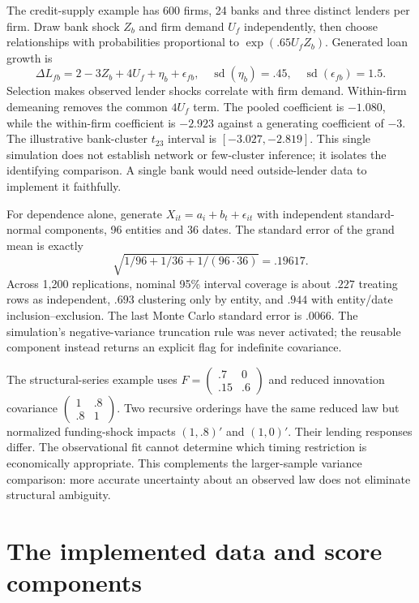 The credit-supply example has 600 firms, 24 banks and three distinct
lenders per firm. Draw bank shock $Z_b$ and firm demand $U_f$
independently, then choose relationships with probabilities proportional
to $\exp(.65U_fZ_b)$. Generated loan growth is
\[
 \Delta L_{fb}=2-3Z_b+4U_f+\eta_b+\epsilon_{fb},
 \quad \operatorname{sd}(\eta_b)=.45,\quad
 \operatorname{sd}(\epsilon_{fb})=1.5.
\]
Selection makes observed lender shocks correlate with firm demand.
Within-firm demeaning removes the common $4U_f$ term. The pooled
coefficient is $-1.080$, while the within-firm coefficient is $-2.923$
against a generating coefficient of $-3$. The illustrative bank-cluster
$t_{23}$ interval is $[-3.027,-2.819]$. This single simulation does
not establish network or few-cluster inference; it isolates the
identifying comparison. A single bank would need outside-lender data
to implement it faithfully.

For dependence alone, generate
$X_{it}=a_i+b_t+\epsilon_{it}$ with independent standard-normal
components, 96 entities and 36 dates. The standard error of the
grand mean is exactly
\[
 \sqrt{1/96+1/36+1/(96\cdot36)}=.19617.
\]
Across 1,200 replications, nominal 95\% interval coverage is about
$.227$ treating rows as independent, $.693$ clustering only by entity,
and $.944$ with entity/date inclusion--exclusion. The last Monte Carlo
standard error is $.0066$. The simulation's negative-variance
truncation rule was never activated; the reusable component instead
returns an explicit flag for indefinite covariance.

The structural-series example uses
$F=\left(\begin{smallmatrix}.7&0\\.15&.6\end{smallmatrix}\right)$
and reduced innovation covariance
$\left(\begin{smallmatrix}1&.8\\.8&1\end{smallmatrix}\right)$.
Two recursive orderings have the same reduced law but normalized
funding-shock impacts $(1,.8)'$ and $(1,0)'$. Their lending responses
differ. The observational fit cannot determine which timing restriction
is economically appropriate. This complements the larger-sample
variance comparison: more accurate uncertainty about an observed law
does not eliminate structural ambiguity.



\section{The implemented data and score components}
\label{r3:component-evidence}


